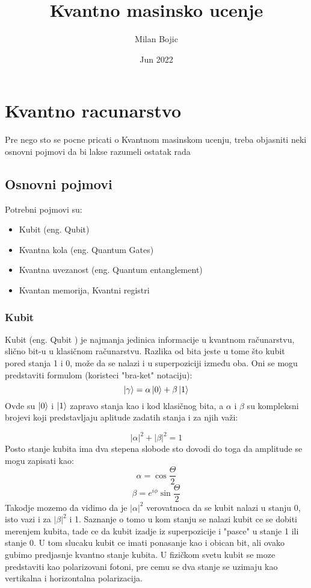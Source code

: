 \documentclass[12pt, letterpaper, oneside]{article}
\title{Kvantno masinsko ucenje}
\author{Milan Bojic}
\date{Jun 2022}
\begin{document}
\maketitle
\newpage

\tableofcontents
\newpage
\section{Kvantno racunarstvo}
Pre nego sto se pocne pricati o Kvantnom masinskom ucenju, treba objasniti neki osnovni pojmovi da bi lakse razumeli ostatak rada

\subsection{Osnovni pojmovi}
Potrebni pojmovi su:
\begin{itemize}
    \item Kubit (eng. Qubit)
    \item Kvantna kola (eng. Quantum Gates)
    \item Kvantna uvezanost (eng. Quantum entanglement)
    \item Kvantan memorija, Kvantni registri
\end{itemize}

\subsubsection*{Kubit}
Kubit (eng. Qubit ) je najmanja jedinica informacije u kvantnom računarstvu, slično bit-u u klasičnom računarstvu.
Razlika od bita jeste u tome što kubit pored stanja 1 i 0, može da se nalazi i u superpoziciji između oba.
Oni se mogu predstaviti formulom (koristeci "bra-ket" notaciju):
\[ \ket{\gamma} =  \alpha\ket{0}+\beta\ket{1} \]
Ovde su $\ket{0}$ i $\ket{1}$ zapravo stanja kao i kod klasičnog bita, a $\alpha$ i $\beta$ su kompleksni brojevi koji predstavljaju aplitude zadatih stanja i za njih važi:

\[ |\alpha|^2+|\beta|^2 = 1 \]
Posto stanje kubita ima dva stepena slobode sto dovodi do toga da amplitude se mogu zapisati kao:
\[
    \alpha = \cos{\frac{\Theta}{2}} 
\]
\[
    \beta = e^{i\phi}\sin{\frac{\Theta}{2}}
\]
Takodje mozemo da vidimo da je $|\alpha|^2$ verovatnoca da se kubit nalazi u stanju 0, isto vazi i za $ |\beta|^2$ i 1.
Saznanje o tomo u kom stanju se nalazi kubit ce se dobiti merenjem kubita, tade ce da kubit izadje iz superpozicije i "pasce" u stanje 1 ili stanje 0. U tom slucaku kubit ce imati ponasanje kao i obican bit, ali ovako gubimo predjasnje kvantno stanje kubita.
U fizičkom svetu kubit se moze predstaviti kao polarizovani fotoni, pre cemu se dva stanje se uzimaju kao vertikalna i horizontalna polarizacija.
\end{document}
